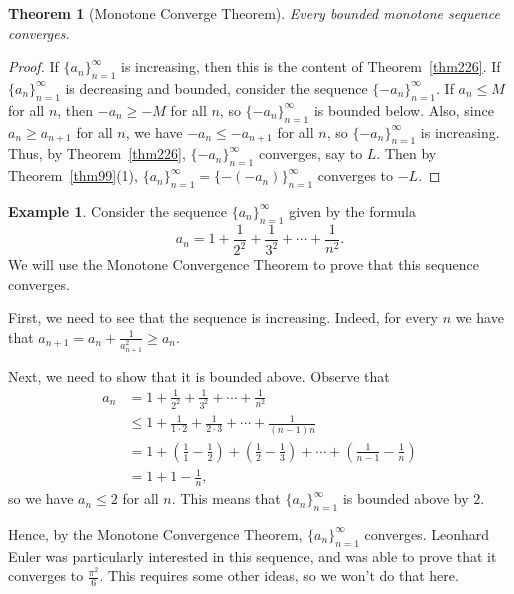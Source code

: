 \documentclass[12pt]{amsart}
\numberwithin{equation}{section}
\theoremstyle{plain} %
\newtheorem{thm}[equation]{Theorem}
\theoremstyle{definition}
\newtheorem{ex}[equation]{Example}
\theoremstyle{remark}
\begin{document}
\begin{thm}[Monotone Converge Theorem]\label{thm:MCT} Every bounded monotone sequence converges.
\end{thm}
\begin{proof}
If $\{a_n\}_{n=1}^\infty$ is increasing, then this is the content of Theorem~\ref{thm226}. If $\{a_n\}_{n=1}^\infty$ is decreasing and bounded, consider the sequence $\{-a_n\}_{n=1}^\infty$. If $a_n\leq M$ for all $n$, then $-a_n\geq -M$ for all $n$, so $\{-a_n\}_{n=1}^\infty$ is bounded below. Also, since $a_n \geq a_{n+1}$ for all $n$, we have $-a_n \leq -a_{n+1}$ for all $n$, so $\{-a_n\}_{n=1}^\infty$ is increasing. Thus, by Theorem~\ref{thm226}, $\{-a_n\}_{n=1}^\infty$ converges, say to $L$. Then by Theorem~\ref{thm99}(1), $\{a_n\}_{n=1}^\infty=\{-(-a_n)\}_{n=1}^\infty$ converges to $-L$.
\end{proof}

\begin{ex}
	Consider the sequence $\{a_n\}_{n=1}^\infty$ given by the formula
	\[ a_n = 1 + \frac{1}{2^2} + \frac{1}{3^2} + \cdots + \frac{1}{n^2}.\]
	We will use the Monotone Convergence Theorem to prove that this sequence converges.
	
	First, we need to see that the sequence is increasing. Indeed, for every $n$ we have that $a_{n+1} = a_n + \frac{1}{a_{n+1}^2} \geq a_n$.
	
	Next, we need to show that it is bounded above. Observe that
	\begin{align*} 
a_n &= 1 + \frac{1}{2^2} + \frac{1}{3^2} + \cdots + \frac{1}{n^2} \\
&\leq 1 + \frac{1}{1 \cdot 2} + \frac{1}{2 \cdot 3} + \cdots + \frac{1}{(n-1) n}\\
&= 1+ (\frac{1}{1} - \frac{1}{2}) + (\frac{1}{2} - \frac{1}{3})
 + \cdots +  (\frac{1}{n-1} - \frac{1}{n})\\
 &= 1 + 1 - \frac{1}{n},
		\end{align*}
		so we have $a_n \leq 2$ for all $n$. This means that $\{a_n\}_{n=1}^\infty$ is bounded above by $2$. 
		
		Hence, by the Monotone Convergence Theorem, $\{a_n\}_{n=1}^\infty$ converges. Leonhard Euler was particularly interested in this sequence, and was able to prove that it converges to $\frac{\pi^2}{6}$. This requires some other ideas, so we won't do that here.
	\end{ex}
	
\end{document}
